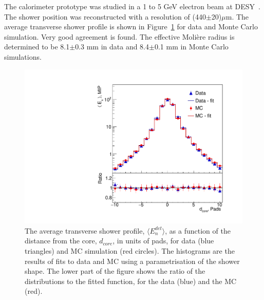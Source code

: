 The calorimeter prototype was studied in a 1 to 5 GeV electron beam at DESY~\cite{Ghenescu:2018sow}. The shower position was reconstructed with a resolution of (440$\pm$20)$\mu$m.
The average transverse shower profile is shown in 
Figure~\ref{MR_5GeV} for data and Monte Carlo simulation. Very good agreement is found. The effective Moli\`ere radius is
determined to be 8.1$\pm$0.3 mm in data and 8.4$\pm$0.1 mm in Monte Carlo simulations.

\begin{figure}[h!]
      \includegraphics[width=\textwidth]{Calorimeter/FCAL/figs/MR_5GeV_EffS_v3.pdf}
    \caption{The average transverse shower profile, $\langle E^{det}_{n} \rangle$, as a function 
of the distance from the core, $d_{core}$, in units of pads, for data (blue triangles) and MC 
simulation (red circles). The histograms are the results of fits to data and MC using a parametrisation of the 
shower shape. The lower part of the figure shows the ratio 
of the distributions to the fitted function, for the data (blue) and the MC (red).   }
    \label{MR_5GeV}
\end{figure}


